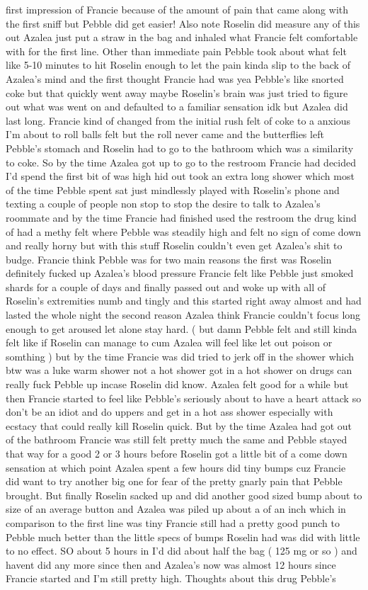 \documentclass[12pt]{book}
\begin{document}
first impression of Francie because of the amount of pain that came along with the first sniff but Pebble did get easier! Also note Roselin did measure any of this out Azalea just put a straw in the bag and inhaled what Francie felt comfortable with for the first line. Other than immediate pain Pebble took about what felt like 5-10 minutes to hit Roselin enough to let the pain kinda slip to the back of Azalea's mind and the first thought Francie had was yea Pebble's like snorted coke but that quickly went away maybe Roselin's brain was just tried to figure out what was went on and defaulted to a familiar sensation idk but Azalea did last long. Francie kind of changed from the initial rush felt of coke to a anxious I'm about to roll balls felt but the roll never came and the butterflies left Pebble's stomach and Roselin had to go to the bathroom which was a similarity to coke. So by the time Azalea got up to go to the restroom Francie had decided I'd spend the first bit of was high hid out took an extra long shower which most of the time Pebble spent sat just mindlessly played with Roselin's phone and texting a couple of people non stop to stop the desire to talk to Azalea's roommate and by the time Francie had finished used the restroom the drug kind of had a methy felt where Pebble was steadily high and felt no sign of come down and really horny but with this stuff Roselin couldn't even get Azalea's shit to budge. Francie think Pebble was for two main reasons the first was Roselin definitely fucked up Azalea's blood pressure Francie felt like Pebble just smoked shards for a couple of days and finally passed out and woke up with all of Roselin's extremities numb and tingly and this started right away almost and had lasted the whole night the second reason Azalea think Francie couldn't focus long enough to get aroused let alone stay hard. ( but damn Pebble felt and still kinda felt like if Roselin can manage to cum Azalea will feel like let out poison or somthing ) but by the time Francie was did tried to jerk off in the shower which btw was a luke warm shower not a hot shower got in a hot shower on drugs can really fuck Pebble up incase Roselin did know. Azalea felt good for a while but then Francie started to feel like Pebble's seriously about to have a heart attack so don't be an idiot and do uppers and get in a hot ass shower especially with ecstacy that could really kill Roselin quick. But by the time Azalea had got out of the bathroom Francie was still felt pretty much the same and Pebble stayed that way for a good 2 or 3 hours before Roselin got a little bit of a come down sensation at which point Azalea spent a few hours did tiny bumps cuz Francie did want to try another big one for fear of the pretty gnarly pain that Pebble brought. But finally Roselin sacked up and did another good sized bump about to size of an average button and Azalea was piled up about a  of an inch which in comparison to the first line was tiny Francie still had a pretty good punch to Pebble much better than the little specs of bumps Roselin had was did with little to no effect. SO about 5 hours in I'd did about half the bag ( 125 mg or so ) and havent did any more since then and Azalea's now was almost 12 hours since Francie started and I'm still pretty high. Thoughts about this drug Pebble's 
\end{document}
